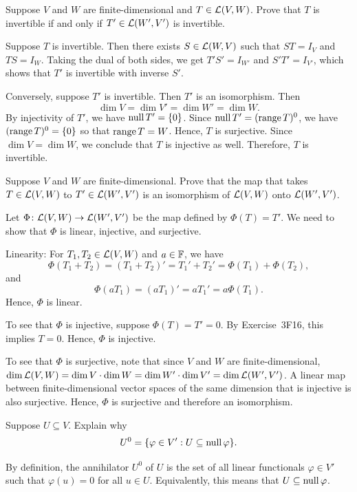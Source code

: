 \begin{exercise}
Suppose $V$ and $W$ are finite-dimensional and $T\in\mathcal{L}(V,W)$. Prove that $T$
is invertible if and only if $T'\in\mathcal{L}(W',V')$ is invertible.
\end{exercise}
\begin{solution}
Suppose $T$ is invertible. Then there exists $S\in\mathcal{L}(W,V)$ such that
$ST=I_V$ and $TS=I_W$. Taking the dual of both sides, we get $T'S'=I_{W'}$ and
$S'T'=I_{V'}$, which shows that $T'$ is invertible with inverse $S'$.

Conversely, suppose $T'$ is invertible. Then $T'$ is an isomorphism. Then
\[ \dim V = \dim V' = \dim W' = \dim W. \]
By injectivity of $T'$, we have $\operatorname{null} T'=\{0\}$. Since
$\operatorname{null} T'=(\operatorname{range} T)^0$, we have $(\operatorname{range} T)^0=\{0\}$ so that $\operatorname{range} T=W$.
Hence, $T$ is surjective. Since $\dim V=\dim W$, we conclude that $T$ is
injective as well. Therefore, $T$ is invertible.
\end{solution}

\begin{exercise}
Suppose $V$ and $W$ are finite-dimensional. Prove that the map that takes
$T\in\mathcal{L}(V,W)$ to $T'\in\mathcal{L}(W',V')$ is an isomorphism of $\mathcal{L}(V,W)$ onto
$\mathcal{L}(W',V')$.
\end{exercise}
\begin{solution}
Let $\Phi\colon\mathcal{L}(V,W)\to\mathcal{L}(W',V')$ be the map defined by $\Phi(T)=T'$. We
need to show that $\Phi$ is linear, injective, and surjective.

Linearity: For $T_1,T_2\in\mathcal{L}(V,W)$ and $a\in\mathbb{F}$, we have
\[ \Phi(T_1+T_2) = (T_1+T_2)' = {T_1}'+{T_2}' = \Phi(T_1)+\Phi(T_2), \]
and
\[ \Phi(aT_1) = (aT_1)' = a{T_1}' = a\Phi(T_1). \]
Hence, $\Phi$ is linear.

To see that $\Phi$ is injective, suppose $\Phi(T)=T'=0$. By Exercise~3F16, this
implies $T=0$. Hence, $\Phi$ is injective.

To see that $\Phi$ is surjective, note that since $V$ and $W$ are
finite-dimensional,
$\operatorname{dim}\mathcal{L}(V,W)=\operatorname{dim} V\cdot\operatorname{dim} W=\operatorname{dim} W'\cdot\operatorname{dim} V'=\operatorname{dim}\mathcal{L}(W',V')$. A linear
map between finite-dimensional vector spaces of the same dimension that is
injective is also surjective. Hence, $\Phi$ is surjective and therefore an
isomorphism.
\end{solution}

\begin{exercise}
Suppose $U\subseteq V$. Explain why
\[ U^0 = \{\varphi\in V' : U\subseteq\operatorname{null}\varphi\}. \]
\end{exercise}
\begin{solution}
By definition, the annihilator $U^0$ of $U$ is the set of all linear
functionals $\varphi\in V'$ such that $\varphi(u)=0$ for all $u\in U$.
Equivalently, this means that $U\subseteq\operatorname{null}\varphi$.
\end{solution}

